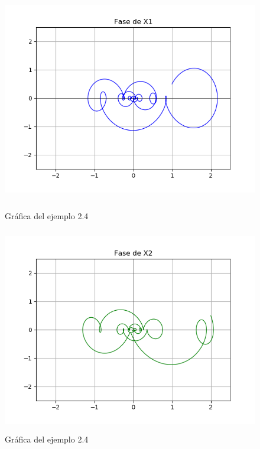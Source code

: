 \begin{figure}[h!]
	\begin{center}
        \includegraphics[height=9cm]{Ejem2_4-GrafA}
        \caption{Gráfica del ejemplo 2.4}
        \label{Ejem2.4-GrafA}

        \includegraphics[height=9cm]{Ejem2_4-GrafB}
        \caption{Gráfica del ejemplo 2.4}
    \end{center}
\end{figure}

